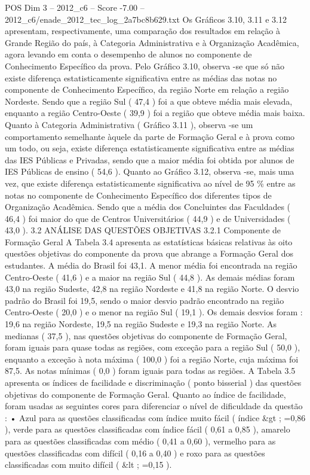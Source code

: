 \begin{textsample}{POS Dim 3 – 2012\_c6 – Score -7.00 – 2012\_c6/enade\_2012\_tec\_log\_2a7bc8b629.txt}
Os Gráficos 3.10, 3.11 e 3.12 apresentam, respectivamente, uma comparação dos resultados em relação à Grande Região do país, à Categoria Administrativa e à Organização Acadêmica, agora levando em conta o desempenho de alunos no componente de Conhecimento Específico da prova.
Pelo Gráfico 3.10, observa -se que só não existe diferença estatisticamente significativa entre as médias das notas no componente de Conhecimento Específico, da região Norte em relação a região Nordeste.
Sendo que a região Sul ( 47,4 ) foi a que obteve média mais elevada, enquanto a região Centro-Oeste ( 39,9 ) foi a região que obteve média mais baixa.
Quanto à Categoria Administrativa ( Gráfico 3.11 ), observa -se um comportamento semelhante àquele da parte de Formação Geral e à prova como um todo, ou seja, existe diferença estatisticamente significativa entre as médias das IES Públicas e Privadas, sendo que a maior média foi obtida por alunos de IES Públicas de ensino ( 54,6 ).
Quanto ao Gráfico 3.12, observa -se, mais uma vez, que existe diferença estatisticamente significativa ao nível de 95 \% entre as notas no componente de Conhecimento Específico dos diferentes tipos de Organização Acadêmica.
Sendo que a média dos Concluintes das Faculdades ( 46,4 ) foi maior do que de Centros Universitários ( 44,9 ) e de Universidades ( 43,0 ). 3.2 ANÁLISE DAS QUESTÕES OBJETIVAS 3.2.1 Componente de Formação Geral A Tabela 3.4 apresenta as estatísticas básicas relativas às oito questões objetivas do componente da prova que abrange a Formação Geral dos estudantes.
A média do Brasil foi 43,1.
A menor média foi encontrada na região Centro-Oeste ( 41,6 ) e a maior na região Sul ( 44,8 ).
As demais médias foram 43,0 na região Sudeste, 42,8 na região Nordeste e 41,8 na região Norte.
O desvio padrão do Brasil foi 19,5, sendo o maior desvio padrão encontrado na região Centro-Oeste ( 20,0 ) e o menor na região Sul ( 19,1 ).
Os demais desvios foram : 19,6 na região Nordeste, 19,5 na região Sudeste e 19,3 na região Norte.
As medianas ( 37,5 ), nas questões objetivas do componente de Formação Geral, foram iguais para quase todas as regiões, com exceção para a região Sul ( 50,0 ), enquanto a exceção à nota máxima ( 100,0 ) foi a região Norte, cuja máxima foi 87,5.
As notas mínimas ( 0,0 ) foram iguais para todas as regiões.
A Tabela 3.5 apresenta os índices de facilidade e discriminação ( ponto bisserial ) das questões objetivas do componente de Formação Geral.
Quanto ao índice de facilidade, foram usadas as seguintes cores para diferenciar o nível de dificuldade da questão : • Azul para as questões classificadas com índice muito fácil ( índice \&gt ; =0,86 ), verde para as questões classificadas com índice fácil ( 0,61 a 0,85 ), amarelo para as questões classificadas com médio ( 0,41 a 0,60 ), vermelho para as questões classificadas com difícil ( 0,16 a 0,40 ) e roxo para as questões classificadas com muito difícil ( \&lt ; =0,15 ).

\end{textsample}
